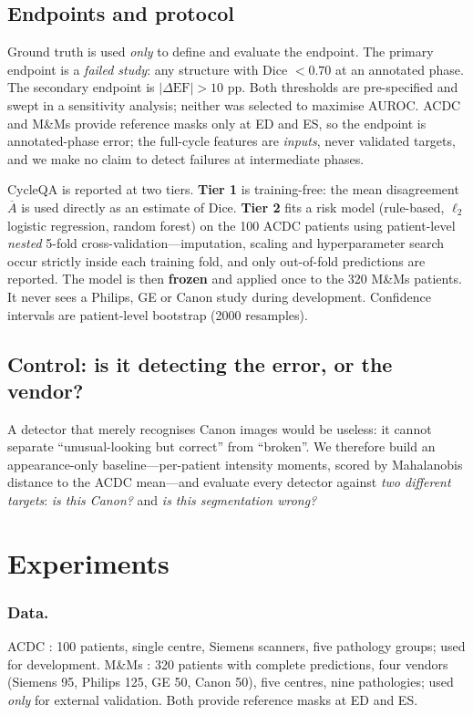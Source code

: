 \documentclass[runningheads]{llncs}
\newcommand{\CQ}{CycleQA}
\begin{document}
\subsection{Endpoints and protocol}
Ground truth is used \emph{only} to define and evaluate the endpoint. The primary endpoint
is a \emph{failed study}: any structure with Dice $<0.70$ at an annotated phase. The
secondary endpoint is $|\Delta \mathrm{EF}| > 10$ pp. Both thresholds are pre-specified and
swept in a sensitivity analysis; neither was selected to maximise AUROC. ACDC and M\&Ms
provide reference masks only at ED and ES, so the endpoint is annotated-phase error; the
full-cycle features are \emph{inputs}, never validated targets, and we make no claim to
detect failures at intermediate phases.

\CQ{} is reported at two tiers. \textbf{Tier 1} is training-free: the mean disagreement
$\overline{A}$ is used directly as an estimate of Dice. \textbf{Tier 2} fits a risk model
(rule-based, $\ell_2$ logistic regression, random forest) on the 100 ACDC patients using
patient-level \emph{nested} 5-fold cross-validation---imputation, scaling and hyperparameter
search occur strictly inside each training fold, and only out-of-fold predictions are
reported. The model is then \textbf{frozen} and applied once to the 320 M\&Ms patients. It
never sees a Philips, GE or Canon study during development. Confidence intervals are
patient-level bootstrap (2000 resamples).

\subsection{Control: is it detecting the error, or the vendor?}
A detector that merely recognises Canon images would be useless: it cannot separate
``unusual-looking but correct'' from ``broken''. We therefore build an appearance-only
baseline---per-patient intensity moments, scored by Mahalanobis distance to the ACDC
mean---and evaluate every detector against \emph{two different targets}: \emph{is this
Canon?} and \emph{is this segmentation wrong?}


\section{Experiments}

\subsubsection{Data.} ACDC \cite{bernard2018acdc}: 100 patients, single centre, Siemens
scanners, five pathology groups; used for development. M\&Ms \cite{campello2021mnms}: 320
patients with complete predictions, four vendors (Siemens 95, Philips 125, GE 50, Canon 50),
five centres, nine pathologies; used \emph{only} for external validation. Both provide
reference masks at ED and ES.
\end{document}
